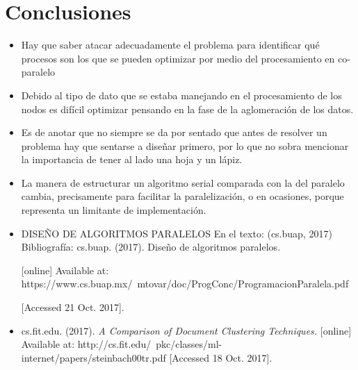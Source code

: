 \documentclass[fleqn,10pt]{SelfArx} %
\begin{document}
\section*{Conclusiones} %


\begin{itemize}
	\item Hay que saber atacar adecuadamente el problema para identificar qué procesos son los que se pueden optimizar por medio del procesamiento en co-paralelo
	\item Debido al tipo de dato que se estaba manejando en el procesamiento de los nodos es difícil optimizar pensando en la fase de la aglomeración de los datos.
	\item Es de anotar que no siempre se da por sentado que antes de resolver un problema hay que sentarse a diseñar primero, por lo que no sobra mencionar la importancia de tener al lado una hoja y un lápiz.
	\item La manera de estructurar un algoritmo serial comparada con la del paralelo cambia, precisamente para facilitar la paralelización, o en ocasiones, porque representa un limitante de implementación.
\end{itemize}


%

\begin{itemize}[noitemsep] %
	\item DISEÑO DE ALGORITMOS PARALELOS
	En el texto: (cs.buap, 2017)
	Bibliografía: cs.buap. (2017). Diseño de algoritmos paralelos. 
	
	[online] Available at: https://www.cs.buap.mx/~mtovar/doc/ProgConc/ProgramacionParalela.pdf 
	
	[Accessed 21 Oct. 2017].
	\item cs.fit.edu. (2017). \textit{A Comparison of Document Clustering Techniques.} [online] Available at: http://cs.fit.edu/~pkc/classes/ml-internet/papers/steinbach00tr.pdf [Accessed 18 Oct. 2017].
	\label{refer:1}
\end{itemize}


\end{document}
